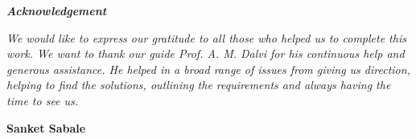 \documentclass[./seminar_report.tex]{subfiles}
\begin{document}
\newpage

\pagebreak
\hspace{0pt}
\vfill
{\LARGE \textbf{\textit{Acknowledgement}}}

\begin{FlushLeft}
{\large \textit{
\quad We would like to express our gratitude to all those who helped us to complete
this work. We want to thank our guide Prof. A. M. Dalvi for his continuous help and 
generous assistance. He helped in a broad range of issues from giving us
direction, helping to find the solutions, outlining the requirements and always
having the time to see us.
}}
\\

\end{FlushLeft}


\begin{FlushRight}

{\large \textbf{Sanket Sabale}}

\end{FlushRight}



\vfill
\hspace{0pt}
\pagebreak
\end{document}
